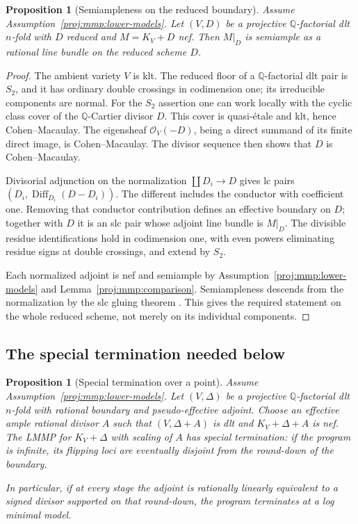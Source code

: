 \documentclass[11pt,letterpaper]{article}
\newcommand{\Q}{\mathbb{Q}}
\newcommand{\OO}{\mathcal{O}}
\newtheorem{proposition}[theorem]{Proposition}
\theoremstyle{definition}
\theoremstyle{remark}
\begin{document}
\begin{proposition}[Semiampleness on the reduced boundary]
\label{proj:prop:boundary-restriction}
Assume Assumption~\ref{proj:mmp:lower-models}. Let \((V,D)\) be a
projective \(\Q\)-factorial dlt \(n\)-fold with \(D\) reduced and
\(M=K_V+D\) nef. Then \(M|_D\) is semiample as a rational line
bundle on the reduced scheme \(D\).
\end{proposition}

\begin{proof}
The ambient variety \(V\) is klt. The reduced floor of a
\(\Q\)-factorial dlt pair is \(S_2\), and it has ordinary double
crossings in codimension one; its irreducible components are normal.
For the \(S_2\) assertion one can work locally with the cyclic
class cover of the \(\Q\)-Cartier divisor \(D\). This cover is
quasi-\'etale and klt, hence Cohen--Macaulay. The eigensheaf
\(\OO_V(-D)\), being a direct summand of its finite direct image,
is Cohen--Macaulay. The divisor sequence then shows that \(D\)
is Cohen--Macaulay.

Divisorial adjunction on the normalization
\(\coprod D_i\to D\) gives lc pairs
\((D_i,\operatorname{Diff}_{D_i}(D-D_i))\).
The different includes the conductor with coefficient one.
Removing that conductor contribution defines an effective boundary
on \(D\); together with \(D\) it is an slc pair whose adjoint
line bundle is \(M|_D\). The divisible residue identifications
hold in codimension one, with even powers eliminating residue
signs at double crossings, and extend by \(S_2\).

Each normalized adjoint is nef and semiample by
Assumption~\ref{proj:mmp:lower-models} and
Lemma~\ref{proj:mmp:comparison}.
Semiampleness descends from the normalization by the slc gluing
theorem \cite[Theorem~1.5, equivalently Theorem~4.3]
{FujinoGongyoPluricanonical}. This gives the required statement on the
whole reduced scheme, not merely on its individual components.
\end{proof}

\subsection{The special termination needed below}

\begin{proposition}[Special termination over a point]
\label{proj:prop:special-termination}
Assume Assumption~\ref{proj:mmp:lower-models}.
Let \((V,\Delta)\) be a projective \(\Q\)-factorial dlt
\(n\)-fold with rational boundary and pseudo-effective adjoint.
Choose an effective ample rational divisor \(A\) such that
\((V,\Delta+A)\) is dlt and \(K_V+\Delta+A\) is nef.
The LMMP for \(K_V+\Delta\) with scaling of \(A\) has special
termination: if the program is infinite, its flipping loci
are eventually disjoint from the round-down of the boundary.

In particular, if at every stage the adjoint is rationally linearly
equivalent to a signed divisor supported on that round-down, the
program terminates at a log minimal model.
\end{proposition}
\end{document}
